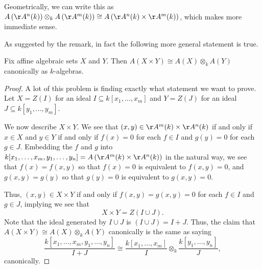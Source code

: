 \begin{remark}
	Geometrically, we can write this as $A\left(\AA^n(k)\right)\otimes_kA\left(\AA^m(k)\right)\cong A\left(\AA^n(k)\times\AA^m(k)\right)$, which makes more immediate sense.
\end{remark}
As suggested by the remark, in fact the following more general statement is true.
\begin{proposition}
	Fix affine algebraic sets $X$ and $Y$. Then $A(X\times Y)\cong A(X)\otimes_kA(Y)$ canonically as $k$-algebras.
\end{proposition}
\begin{proof}
	A lot of this problem is finding exactly what statement we want to prove. Let $X=Z(I)$ for an ideal $I\subseteq k[x_1,\ldots,x_m]$ and $Y=Z(J)$ for an ideal $J\subseteq k[y_1,\ldots,y_m]$.

	We now describe $X\times Y$. We see that $(x,y)\in\AA^m(k)\times\AA^n(k)$ if and only if $x\in X$ and $y\in Y$ if and only if $f(x)=0$ for each $f\in I$ and $g(y)=0$ for each $g\in J.$ Embedding the $f$ and $g$ into $k[x_1,\ldots,x_m,y_1,\ldots,y_n]=A\left(\AA^m(k)\times\AA^n(k)\right)$ in the natural way, we see that $f(x)=f(x,y)$ so that $f(x)=0$ is equivalent to $f(x,y)=0$, and $g(x,y)=g(y)$ so that $g(y)=0$ is equivalent to $g(x,y)=0$.

	Thus, $(x,y)\in X\times Y$ if and only if $f(x,y)=g(x,y)=0$ for each $f\in I$ and $g\in J$, implying we see that
	\[X\times Y=Z(I\cup J).\]
	Note that the ideal generated by $I\cup J$ is $(I\cup J)=I+J$. Thus, the claim that $A(X\times Y)\cong A(X)\otimes_kA(Y)$ canonically is the same as saying
	\[\frac{k[x_1,\ldots,x_m,y_1,\ldots,y_n]}{I+J}\cong\frac{k[x_1,\ldots,x_m]}{I}\otimes_k\frac{k[y_1,\ldots,y_n]}{J},\]
	canonically.
	

\end{proof}

